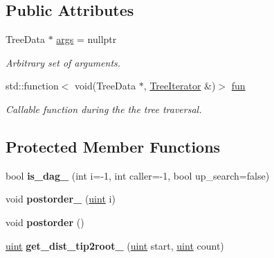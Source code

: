 \subsection*{Public Attributes}
\begin{DoxyCompactItemize}
\item 
\mbox{\label{classpruner_1_1Tree_afe84a58af72b0d544dcc7ceff96daf8d}} 
Tree\+Data $\ast$ \hyperlink{classpruner_1_1Tree_afe84a58af72b0d544dcc7ceff96daf8d}{args} = nullptr
\begin{DoxyCompactList}\small\item\em Arbitrary set of arguments. \end{DoxyCompactList}\item 
std\+::function$<$ void(Tree\+Data $\ast$, \hyperlink{classpruner_1_1TreeIterator}{Tree\+Iterator} \&)$>$ \hyperlink{classpruner_1_1Tree_a243f4077cc9974d6de6a6af0f3e9b0fd}{fun}
\begin{DoxyCompactList}\small\item\em Callable function during the the tree traversal. \end{DoxyCompactList}\end{DoxyCompactItemize}
\subsection*{Protected Member Functions}
\begin{DoxyCompactItemize}
\item 
\mbox{\label{classpruner_1_1Tree_a4f73b72aa5a79068661593ae32cb8f57}} 
bool {\bfseries is\+\_\+dag\+\_\+} (int i=-\/1, int caller=-\/1, bool up\+\_\+search=false)
\item 
\mbox{\label{classpruner_1_1Tree_ad082d4d0c63728243e027aba5882d76e}} 
void {\bfseries postorder\+\_\+} (\hyperlink{namespacepruner_a659e6e64a9e2b8e981c3d34262a2f67e}{uint} i)
\item 
\mbox{\label{classpruner_1_1Tree_a955f3ddab30616447f4d785272cfa090}} 
void {\bfseries postorder} ()
\item 
\mbox{\label{classpruner_1_1Tree_a83d01c0cde3abfcc0f09c0bf33795259}} 
\hyperlink{namespacepruner_a659e6e64a9e2b8e981c3d34262a2f67e}{uint} {\bfseries get\+\_\+dist\+\_\+tip2root\+\_\+} (\hyperlink{namespacepruner_a659e6e64a9e2b8e981c3d34262a2f67e}{uint} start, \hyperlink{namespacepruner_a659e6e64a9e2b8e981c3d34262a2f67e}{uint} count)
\end{DoxyCompactItemize}

